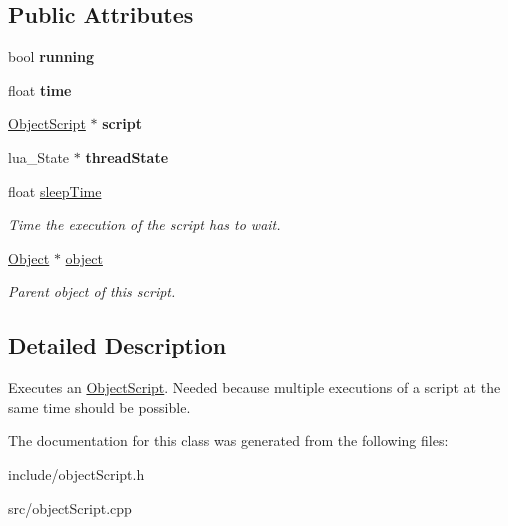 \subsection*{\-Public \-Attributes}
\begin{DoxyCompactItemize}
\item 
\hypertarget{classObjectScriptExecutor_a644eeb507e3fd8ef21ab4f9d2bcfdba7}{
bool {\bfseries running}}
\label{de/d7c/classObjectScriptExecutor_a644eeb507e3fd8ef21ab4f9d2bcfdba7}

\item 
\hypertarget{classObjectScriptExecutor_af20c3c8b7cb8f5f1ed14a422d985b617}{
float {\bfseries time}}
\label{de/d7c/classObjectScriptExecutor_af20c3c8b7cb8f5f1ed14a422d985b617}

\item 
\hypertarget{classObjectScriptExecutor_ac1928debde95ba1abffdae3a4dda2bff}{
\hyperlink{classObjectScript}{\-Object\-Script} $\ast$ {\bfseries script}}
\label{de/d7c/classObjectScriptExecutor_ac1928debde95ba1abffdae3a4dda2bff}

\item 
\hypertarget{classObjectScriptExecutor_a8c771397c1b681d4a5e3141aedd3d371}{
lua\-\_\-\-State $\ast$ {\bfseries thread\-State}}
\label{de/d7c/classObjectScriptExecutor_a8c771397c1b681d4a5e3141aedd3d371}

\item 
\hypertarget{classObjectScriptExecutor_a6e2c56b81933f6e2e9eda479aeb30726}{
float \hyperlink{classObjectScriptExecutor_a6e2c56b81933f6e2e9eda479aeb30726}{sleep\-Time}}
\label{de/d7c/classObjectScriptExecutor_a6e2c56b81933f6e2e9eda479aeb30726}

\begin{DoxyCompactList}\small\item\em \-Time the execution of the script has to wait. \end{DoxyCompactList}\item 
\hypertarget{classObjectScriptExecutor_a2ec38fb28f01a38be9e9d76205c0715e}{
\hyperlink{classObject}{\-Object} $\ast$ \hyperlink{classObjectScriptExecutor_a2ec38fb28f01a38be9e9d76205c0715e}{object}}
\label{de/d7c/classObjectScriptExecutor_a2ec38fb28f01a38be9e9d76205c0715e}

\begin{DoxyCompactList}\small\item\em \-Parent object of this script. \end{DoxyCompactList}\end{DoxyCompactItemize}


\subsection{\-Detailed \-Description}
\-Executes an \hyperlink{classObjectScript}{\-Object\-Script}. \-Needed because multiple executions of a script at the same time should be possible. 

\-The documentation for this class was generated from the following files\-:\begin{DoxyCompactItemize}
\item 
include/object\-Script.\-h\item 
src/object\-Script.\-cpp\end{DoxyCompactItemize}
